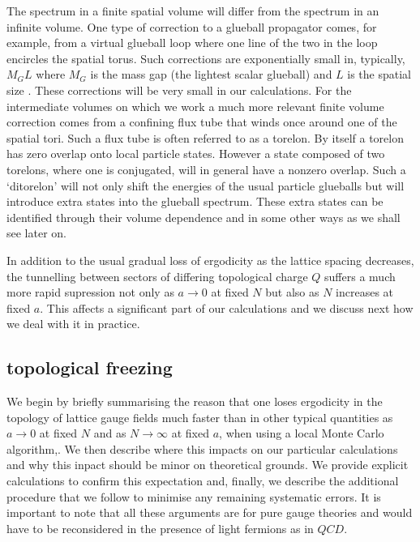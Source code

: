 \documentclass[12pt]{article}
\begin{document}
The spectrum in a finite spatial volume will differ from the spectrum in an infinite
volume. One type of correction to a glueball propagator comes, for example, from a virtual
glueball loop where one line of the two in the loop encircles the spatial torus. Such
corrections are exponentially small in, typically, $M_GL$ where $M_G$ is the mass gap
(the lightest scalar glueball) and $L$ is the spatial size
%
\cite{Luscher-V}.
%
These corrections will be very small in our calculations. For the intermediate volumes
on which we work a much more relevant finite volume correction comes from a confining
flux tube that winds once around one of the spatial tori. Such a flux tube is often
referred to as a torelon. By itself a torelon has zero overlap onto local particle states.
However a state composed of two torelons, where one is conjugated, will in general
have a nonzero overlap. Such a `ditorelon' will not only shift the energies of
the usual particle glueballs but will introduce extra states into the glueball spectrum.
These extra states can be identified through their volume dependence and in some
other ways as we shall see later on.

In addition to the usual gradual loss of ergodicity as the lattice spacing decreases,
the tunnelling between sectors of differing topological charge $Q$ suffers a much more
rapid supression not only as $a\to 0$ at fixed $N$ but also as $N$ increases at fixed $a$.
This affects a significant part of our calculations and we discuss next how we deal with it
in practice.


%
%
\subsection{topological freezing}
\label{subsection_Qfreezing}

We begin by briefly summarising the reason that one loses ergodicity in the
topology of lattice gauge fields much faster than in other typical quantities 
as $a\to 0$ at fixed $N$ and as $N\to\infty$ at fixed $a$, when using a local 
Monte Carlo algorithm,. We then describe where this impacts on our particular
calculations and why this inpact should be minor on theoretical grounds. 
We provide explicit calculations to confirm this expectation and, finally, 
we describe the additional procedure that we follow to minimise any remaining
systematic errors. It is important to note that all these arguments are for pure 
gauge theories and would have to be reconsidered in the presence of light fermions
as in $QCD$.  
\end{document}

